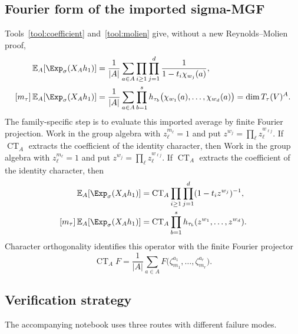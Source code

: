 \documentclass[10pt]{article}
\newcommand{\CT}{\operatorname{CT}}
\begin{document}
\subsection{Fourier form of the imported sigma-MGF}

Tools~\ref{tool:coefficient} and~\ref{tool:molien} give, without a new
Reynolds--Molien proof,
\begin{align}
 \mathbb E_A\!\left[\Exp_\sigma(X_Ah_1)\right]
 &=\frac1{|A|}\sum_{a\in A}
 \prod_{i\ge1}\prod_{j=1}^{d}
 \frac{1}{1-t_i\chi_{w_j}(a)},
 \label{finite-abelian-zero-weight-proof:eq:mgf}\\
 [m_\tau]\,\mathbb E_A\!\left[\Exp_\sigma(X_Ah_1)\right]
 &=\frac1{|A|}\sum_{a\in A}
 \prod_{b=1}^{s}h_{\tau_b}
 \bigl(\chi_{w_1}(a),\ldots,\chi_{w_d}(a)\bigr)
 =\dim T_\tau(V)^A.
 \label{finite-abelian-zero-weight-proof:eq:molien-coefficient}
\end{align}
The family-specific step is to evaluate this imported average by finite
Fourier projection.  Work in the group algebra with
$z_\ell^{m_\ell}=1$ and put
$z^{w_j}=\prod_\ell z_\ell^{w_{\ell j}}$.  If $\CT_A$ extracts the coefficient
of the identity character, then  Work in the group algebra
with $z_\ell^{m_\ell}=1$ and put
$z^{w_j}=\prod_\ell z_\ell^{w_{\ell j}}$.  If $\CT_A$ extracts the coefficient
of the identity character, then
\begin{align}
 \mathbb E_A\!\left[\Exp_\sigma(X_Ah_1)\right]
 &=\CT_A\prod_{i\ge1}\prod_{j=1}^{d}(1-t_i z^{w_j})^{-1},\\
 [m_\tau]\,\mathbb E_A\!\left[\Exp_\sigma(X_Ah_1)\right]
 &=\CT_A\prod_{b=1}^{s}h_{\tau_b}
 (z^{w_1},\ldots,z^{w_d}).
\end{align}
Character orthogonality identifies this operator with the finite Fourier
projector
\[
 \CT_A F=\frac1{|A|}\sum_{a\in A}
 F\bigl(\zeta_{m_1}^{a_1},\ldots,\zeta_{m_r}^{a_r}\bigr).
\]

\subsection{Verification strategy}

The accompanying notebook uses three routes with different failure modes.
\end{document}
